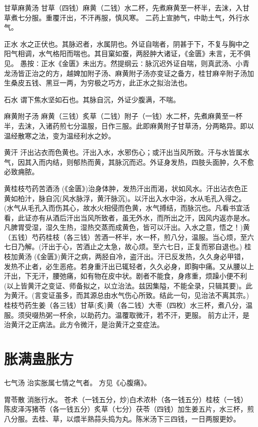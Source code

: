 \documentclass[a4paper,12pt,UTF8,twoside]{ctexbook}
\begin{document}
	甘草麻黄汤
	甘草（四钱）麻黄（二钱）水二杯，先煮麻黄至一杯半，去沫，入甘草煮七分服。重覆汗出，不汗再服，慎风寒。
	二药上宣肺气，中助土气，外行水气。
	
	
	正水	
	水之正伏也。其脉迟者，水属阴也。外证自喘者，阴甚于下，不复与胸中之阳气相调，水气格阳而喘也。其目窠如蚕，两胫肿大诸证，《金匮》未言，无不俱见。
	愚按∶正水《金匮》未出方。然提纲云∶脉沉迟外证自喘，则真武汤、小青龙汤皆正治之的方，越婢加附子汤、麻黄附子汤亦变证之备方，桂甘麻辛附子汤加生桑皮五钱、黑豆一两，为穷极之巧方，此正水之拟治法也。
	
	
	石水	
	谓下焦水坚如石也。其脉自沉，外证少腹满，不喘。
	
	麻黄附子汤
	麻黄（三钱）炙草（二钱）附子（一钱）水二杯，先煮麻黄至一杯半，去沫，入诸药煎七分温服，日作三服。此即麻黄附子甘草汤，分两略异。即以温经散寒之法，变为温经利水之妙。
	
	
	黄汗	
	汗出沾衣而色黄也。汗出入水，水邪伤心；或汗出当风所致。汗与水皆属水气，因其入而内结，则郁热而黄，其脉沉而迟。外证身发热，四肢头面肿，久不愈必致痈脓。
	
	黄桂枝芍药苦酒汤
	(《金匮》)治身体肿，发热汗出而渴，状如风水。汗出沾衣色正黄如柏汁，脉自沉(风水脉浮，黄汗脉沉)。以汗出入水中浴，水从毛孔入得之。(水气从毛孔入而伤其心，故水火相侵而色黄，水气搏结，而脉沉也。凡看书宜活看，此证亦有从酒后汗出当风所致者，虽无外水，而所出之汗，因风内返亦是水。凡脾胃受湿，湿久生热，湿热交蒸而成黄色，皆可以汗出。入水之意，悟之！)黄（五钱）芍药桂枝（各三钱）苦酒一杯半，水一杯，煎八分，温服。当心烦，至六七日乃解。(汗出于心，苦酒止之太急，故心烦。至六七日，正复而邪自退也。)
	桂枝加黄汤
	(《金匮》)黄汗之病，两胫自冷，盗汗出。汗已反发热，久久身必甲错，发热不止者，必生恶疮。若身重汗出已辄轻者，久久必身，即胸中痛。又从腰以上汗出，下无汗，腰弛痛，如有物在皮中状。剧者不能食，身疼重，烦躁小便不利(以上皆黄汗之变证、师备拟之，以立治法。兹因集隘，不能全录，只辑其要)。此为黄汗。(言变证虽多，而其源总由水气伤心所致。结此一句，见治法不离其宗。)桂枝芍药生姜（各三钱）甘草(炙)黄（各二钱）大枣（四枚）水三杯，煮八分，温服。须臾啜热粥一杯余，以助药力。温覆取微汗，若不汗，更服。
	前方止汗，是治黄汗之正病法。此方令微汗，是治黄汗之变症法。
	
	\chapter{胀满蛊胀方}
	   七气汤
	治实胀属七情之气者。
	方见《心腹痛》。
	
	胃苓散
	消胀行水。
	苍术（一钱五分，炒)白术浓朴（各一钱五分）桂枝（一钱）陈皮泽泻猪苓（各一钱五分）炙草（七分）茯苓（四钱）加生姜五片，水三杯，煎八分服。去桂、草，以煨半熟蒜头捣为丸。陈米汤下三四钱，一日两服更妙。
	
\end{document}

